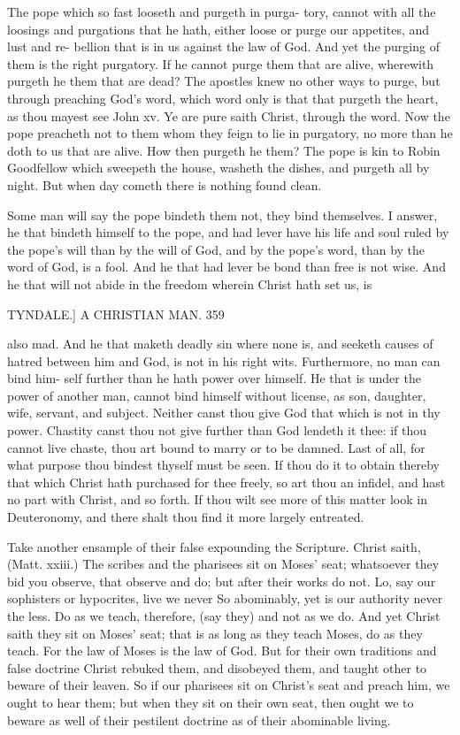 \documentclass{custom}
\begin{document}
{The pope which so fast looseth and purgeth in purga- 
tory, cannot with all the loosings and purgations that he 
hath, either loose or purge our appetites, and lust and re- 
bellion that is in us against the law of God. And yet 
the purging of them is the right purgatory. If he cannot 
purge them that are alive, wherewith purgeth he them 
that are dead? The apostles knew no other ways to 
purge, but through preaching God's word, which word 
only is that that purgeth the heart, as thou mayest see 
John xv. Ye are pure saith Christ, through the word. 
Now the pope preacheth not to them whom they feign to 
lie in purgatory, no more than he doth to us that are alive. 
How then purgeth he them? The pope is kin to Robin 
Goodfellow which sweepeth the house, washeth the dishes, 
and purgeth all by night. But when day cometh there 
is nothing found clean. 

Some man will say the pope bindeth them not, they 
bind themselves. I answer, he that bindeth himself to the 
pope, and had lever have his life and soul ruled by the 
pope's will than by the will of God, and by the pope's 
word, than by the word of God, is a fool. And he that 
had lever be bond than free is not wise. And he that will 
not abide in the freedom wherein Christ hath set us, is 


TYNDALE.]
A CHRISTIAN MAN.
359

also mad. And he that maketh deadly sin where none is, 
and seeketh causes of hatred between him and God, is not 
in his right wits. Furthermore, no man can bind him- 
self further than he hath power over himself. He that 
is under the power of another man, cannot bind himself 
without license, as son, daughter, wife, servant, and 
subject. Neither canst thou give God that which is not 
in thy power. Chastity canst thou not give further than 
God lendeth it thee: if thou cannot live chaste, thou art 
bound to marry or to be damned. Last of all, for what 
purpose thou bindest thyself must be seen. If thou do 
it to obtain thereby that which Christ hath purchased for 
thee freely, so art thou an infidel, and hast no part with 
Christ, and so forth. If thou wilt see more of this matter 
look in Deuteronomy, and there shalt thou find it more 
largely entreated. 

Take another ensample of their false expounding the 
Scripture. Christ saith, (Matt. xxiii.) The scribes and 
the pharisees sit on Moses' seat; whatsoever they bid you 
observe, that observe and do; but after their works do 
not. Lo, say our sophisters or hypocrites, live we never 
So abominably, yet is our authority never the less. Do 
as we teach, therefore, (say they) and not as we do. And 
yet Christ saith they sit on Moses' seat; that is as long as 
they teach Moses, do as they teach. For the law of 
Moses is the law of God. But for their own traditions 
and false doctrine Christ rebuked them, and disobeyed 
them, and taught other to beware of their leaven. So if 
our pharisees sit on Christ's seat and preach him, we 
ought to hear them; but when they sit on their own seat, 
then ought we to beware as well of their pestilent doctrine 
as of their abominable living. 

}
\end{document}
